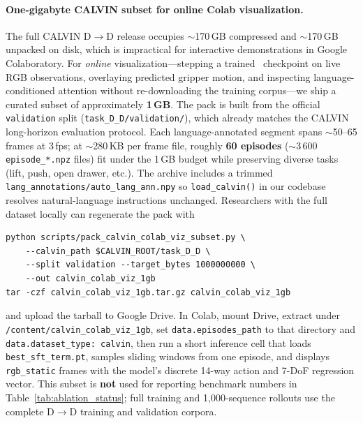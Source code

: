 
\paragraph{One-gigabyte CALVIN subset for online Colab visualization.}
The full CALVIN D$\to$D release occupies ${\sim}$170\,GB compressed and
${\sim}$170\,GB unpacked on disk, which is impractical for interactive
demonstrations in Google Colaboratory.
For \emph{online} visualization---stepping a trained \modelname\ checkpoint on
live RGB observations, overlaying predicted gripper motion, and inspecting
language-conditioned attention without re-downloading the training corpus---we
ship a curated subset of approximately \textbf{1\,GB}.
The pack is built from the official \texttt{validation} split
(\texttt{task\_D\_D/validation/}), which already matches the CALVIN long-horizon
evaluation protocol.
Each language-annotated segment spans ${\sim}$50--65 frames at 3\,fps; at
${\sim}$280\,KB per frame file, roughly \textbf{60 episodes}
(${\sim}$3\,600 \texttt{episode\_*.npz} files) fit under the 1\,GB budget while
preserving diverse tasks (lift, push, open drawer, etc.).
The archive includes a trimmed \texttt{lang\_annotations/auto\_lang\_ann.npy}
so \texttt{load\_calvin()} in our codebase resolves natural-language instructions
unchanged.
Researchers with the full dataset locally can regenerate the pack with
\begin{verbatim}
python scripts/pack_calvin_colab_viz_subset.py \
    --calvin_path $CALVIN_ROOT/task_D_D \
    --split validation --target_bytes 1000000000 \
    --out calvin_colab_viz_1gb
tar -czf calvin_colab_viz_1gb.tar.gz calvin_colab_viz_1gb
\end{verbatim}
and upload the tarball to Google Drive.
In Colab, mount Drive, extract under \texttt{/content/calvin\_colab\_viz\_1gb},
set \texttt{data.episodes\_path} to that directory and
\texttt{data.dataset\_type: calvin}, then run a short inference cell that loads
\texttt{best\_sft\_term.pt}, samples sliding windows from one episode, and
displays \texttt{rgb\_static} frames with the model's discrete 14-way action and
7-DoF regression vector.
This subset is \textbf{not} used for reporting benchmark numbers in
Table~\ref{tab:ablation_status}; full training and 1{,}000-sequence rollouts use
the complete D$\to$D training and validation corpora.

